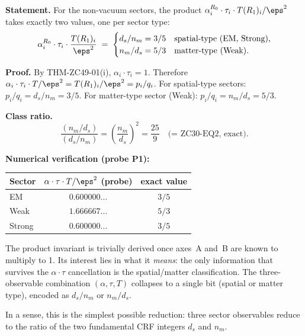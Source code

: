 \documentclass[12pt, a4paper]{article}
\begin{document}
\begin{derivedbox}[title={FIND-ZC49-01: Two-Class Product
  Invariant}]
\textbf{Statement.}
For the non-vacuum sectors, the product
$\alpha_i^{R_0}\cdot\tau_i\cdot T(R_1)_i/\eps^2$
takes exactly two values, one per sector type:
\begin{equation}
  \alpha_i^{R_0}\cdot\tau_i\cdot\frac{T(R_1)_i}{\eps^2}
  \;=\;
  \begin{cases}
    d_s/n_m = 3/5 & \text{spatial-type (EM, Strong),}\\
    n_m/d_s = 5/3 & \text{matter-type (Weak).}
  \end{cases}
  \label{eq:prod-inv}
\end{equation}

\textbf{Proof.}
By THM-ZC49-01(i), $\alpha_i\cdot\tau_i = 1$.
Therefore $\alpha_i\cdot\tau_i\cdot T/\eps^2 = T(R_1)_i/\eps^2
= p_i/q_i$.
For spatial-type sectors: $p_i/q_i = d_s/n_m = 3/5$.
For matter-type sector (Weak): $p_i/q_i = n_m/d_s = 5/3$.

\textbf{Class ratio.}
\[
  \frac{(n_m/d_s)}{(d_s/n_m)}
  = \left(\frac{n_m}{d_s}\right)^{\!2}
  = \frac{25}{9}
  \quad\text{(= ZC30-EQ2, exact).}
\]

\textbf{Numerical verification (probe P1):}
\begin{center}
{\small
\begin{tabular}{lcc}
\toprule
Sector & $\alpha\cdot\tau\cdot T/\eps^2$ (probe) & exact value \\
\midrule
EM     & $0.600000\ldots$ & $3/5$ \\
Weak   & $1.666667\ldots$ & $5/3$ \\
Strong & $0.600000\ldots$ & $3/5$ \\
\bottomrule
\end{tabular}
}
\end{center}
\end{derivedbox}

\begin{derivedbox}[title={Commentary on FIND-ZC49-01}]
The product invariant is trivially derived once axes~A and~B
are known to multiply to 1.
Its interest lies in what it \emph{means}: the only information
that survives the $\alpha\cdot\tau$ cancellation is the
spatial/matter classification.
The three-observable combination $(\alpha, \tau, T)$ collapses
to a single bit (spatial or matter type), encoded as $d_s/n_m$
or $n_m/d_s$.

In a sense, this is the simplest possible reduction: three
sector observables reduce to the ratio of the two fundamental
CRF integers $d_s$ and $n_m$.
\end{derivedbox}
\end{document}
